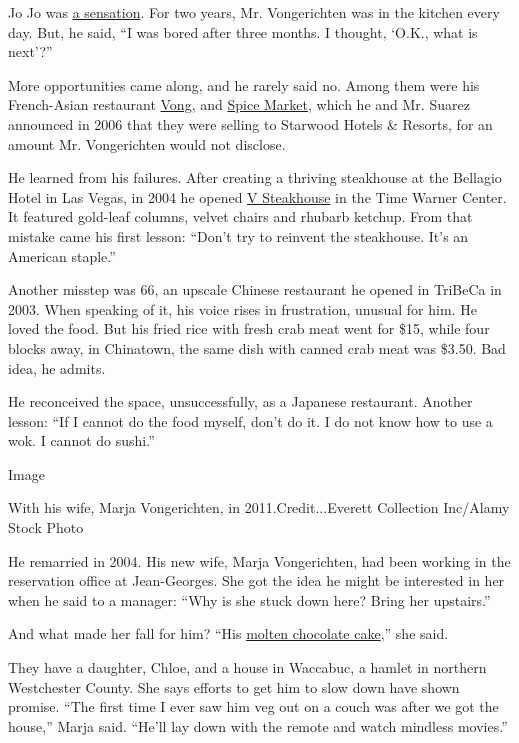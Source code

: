 Jo Jo was
\href{https://www.nytimes.com/1991/07/12/arts/restaurants-737091.html}{a
sensation}. For two years, Mr. Vongerichten was in the kitchen every
day. But, he said, ``I was bored after three months. I thought, `O.K.,
what is next'?''

More opportunities came along, and he rarely said no. Among them were
his French-Asian restaurant
\href{https://www.nytimes.com/2006/08/16/dining/reviews/16rest.html}{Vong},
and
\href{https://www.nytimes.com/2004/03/24/dining/restaurants-fancy-street-food-but-what-a-street.html}{Spice
Market}, which he and Mr. Suarez announced in 2006 that they were
selling to Starwood Hotels \& Resorts, for an amount Mr. Vongerichten
would not disclose.

He learned from his failures. After creating a thriving steakhouse at
the Bellagio Hotel in Las Vegas, in 2004 he opened
\href{https://www.nytimes.com/2004/07/14/dining/restaurants-elaborate-dishes-assembly-required.html}{V
Steakhouse} in the Time Warner Center. It featured gold-leaf columns,
velvet chairs and rhubarb ketchup. From that mistake came his first
lesson: ``Don't try to reinvent the steakhouse. It's an American
staple.''

Another misstep was 66, an upscale Chinese restaurant he opened in
TriBeCa in 2003. When speaking of it, his voice rises in frustration,
unusual for him. He loved the food. But his fried rice with fresh crab
meat went for \$15, while four blocks away, in Chinatown, the same dish
with canned crab meat was \$3.50. Bad idea, he admits.

He reconceived the space, unsuccessfully, as a Japanese restaurant.
Another lesson: ``If I cannot do the food myself, don't do it. I do not
know how to use a wok. I cannot do sushi.''

Image

With his wife, Marja Vongerichten, in 2011.Credit...Everett Collection
Inc/Alamy Stock Photo

He remarried in 2004. His new wife, Marja Vongerichten, had been working
in the reservation office at Jean-Georges. She got the idea he might be
interested in her when he said to a manager: ``Why is she stuck down
here? Bring her upstairs.''

And what made her fall for him? ``His
\href{https://cooking.nytimes.com/recipes/1014719-molten-chocolate-cake}{molten
chocolate cake},'' she said.

They have a daughter, Chloe, and a house in Waccabuc, a hamlet in
northern Westchester County. She says efforts to get him to slow down
have shown promise. ``The first time I ever saw him veg out on a couch
was after we got the house,'' Marja said. ``He'll lay down with the
remote and watch mindless movies.''

